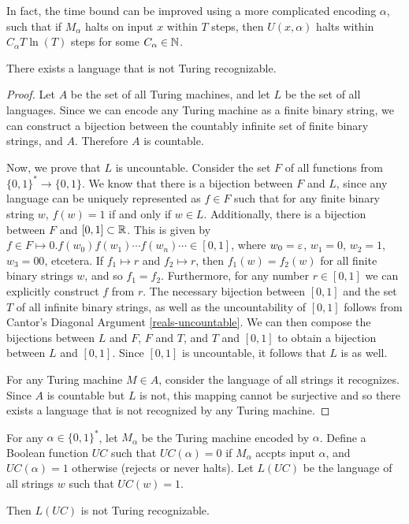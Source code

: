 \begin{rmk}
    In fact, the time bound can be improved using a more complicated encoding $\alpha$, such that if $M_{\alpha}$ halts on input $x$ within $T$ steps, then $U(x, \alpha)$ halts within $C_{\alpha}T\ln(T)$ steps for some $C_{\alpha} \in \mathbb{N}$.
\end{rmk}

\begin{thm}
    There exists a language that is not Turing recognizable.
\end{thm}

\begin{proof}
    Let $A$ be the set of all Turing machines, and let $L$ be the set of all languages. Since we can encode any Turing machine as a finite binary string, we can construct a bijection between the countably infinite set of finite binary strings, and $A$. Therefore $A$ is countable.

    Now, we prove that $L$ is uncountable. Consider the set $F$ of all functions from $\{0, 1\}^{*} \to \{0, 1\}$. We know that there is a bijection between $F$ and $L$, since any language can be uniquely represented as $f \in F$ such that for any finite binary string $w$, $f(w) = 1$ if and only if $w \in L$. Additionally, there is a bijection between $F$ and $[0, 1] \subset \mathbb{R}$. This is given by $f \in F \mapsto 0.f(w_0)f(w_1)\cdots f(w_n)\cdots \in [0, 1]$, where $w_0 = \varepsilon$, $w_1 = 0$, $w_2 = 1$, $w_3 = 00$, etcetera. If $f_1 \mapsto r$ and $f_2 \mapsto r$, then $f_1(w) = f_2(w)$ for all finite binary strings $w$, and so $f_1 = f_2$. Furthermore, for any number $r \in [0, 1]$ we can explicitly construct $f$ from $r$. The necessary bijection between $[0, 1]$ and the set $T$ of all infinite binary strings, as well as the uncountability of $[0, 1]$ follows from Cantor's Diagonal Argument \ref{reals-uncountable}. We can then compose the bijections between $L$ and $F$, $F$ and $T$, and $T$ and $[0, 1]$ to obtain a bijection between $L$ and $[0, 1]$. Since $[0, 1]$ is uncountable, it follows that $L$ is as well.

    For any Turing machine $M \in A$, consider the language of all strings it recognizes. Since $A$ is countable but $L$ is not, this mapping cannot be surjective and so there exists a language that is not recognized by any Turing machine.
\end{proof}

\begin{lemma}\label{halting-lemma}
    For any $\alpha \in \{0, 1\}^{*}$, let $M_{\alpha}$ be the Turing machine encoded by $\alpha$. Define a Boolean function $UC$ such that $UC(\alpha) = 0$ if $M_{\alpha}$ accpts input $\alpha$, and $UC(\alpha) = 1$ otherwise (rejects or never halts). Let $L(UC)$ be the language of all strings $w$ such that $UC(w) = 1$.

    Then $L(UC)$ is not Turing recognizable.
\end{lemma}

